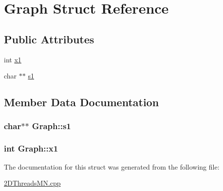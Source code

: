 \hypertarget{structGraph}{\section{Graph Struct Reference}
\label{structGraph}
}
\subsection*{Public Attributes}
\begin{DoxyCompactItemize}
\item 
int \hyperlink{structGraph_a9dd4ae568a6d821eb75f2ed958475090}{x1}
\item 
char $\ast$$\ast$ \hyperlink{structGraph_a7e796504e921c0d9cb144c589f3f48bb}{s1}
\end{DoxyCompactItemize}


\subsection{Member Data Documentation}
\hypertarget{structGraph_a7e796504e921c0d9cb144c589f3f48bb}{
\subsubsection[{s1}]{\setlength{\rightskip}{0pt plus 5cm}char$\ast$$\ast$ Graph\+::s1}}\label{structGraph_a7e796504e921c0d9cb144c589f3f48bb}
\hypertarget{structGraph_a9dd4ae568a6d821eb75f2ed958475090}{
\subsubsection[{x1}]{\setlength{\rightskip}{0pt plus 5cm}int Graph\+::x1}}\label{structGraph_a9dd4ae568a6d821eb75f2ed958475090}


The documentation for this struct was generated from the following file\+:\begin{DoxyCompactItemize}
\item 
\hyperlink{2DThreadsMN_8cpp}{2\+D\+Threads\+M\+N.\+cpp}\end{DoxyCompactItemize}
